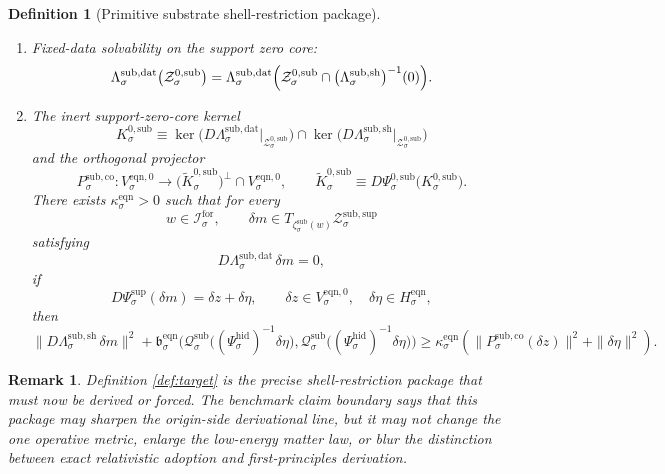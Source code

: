 \documentclass[11pt]{article}
\newcommand{\ForSpace}[1]{\mathcal I_{#1}^{\mathrm{for}}}
\newcommand{\EqnPair}[1]{\mathfrak b_{#1}^{\mathrm{eqn}}}
\newcommand{\EqnZero}[1]{V_{#1}^{\mathrm{eqn},0}}
\newcommand{\EqnHidden}[1]{H_{#1}^{\mathrm{eqn}}}
\newcommand{\SubData}[1]{\Lambda_{#1}^{\mathrm{sub,dat}}}
\newcommand{\SubShellMap}[1]{\Lambda_{#1}^{\mathrm{sub,sh}}}
\newcommand{\SubSupportShell}[1]{\mathcal Z_{#1}^{\mathrm{sub,sup}}}
\newcommand{\SubZeroCore}[1]{\mathcal Z_{#1}^{0,\mathrm{sub}}}
\newcommand{\ShellChart}[1]{\Psi_{#1}^{\mathrm{sup}}}
\newcommand{\SubZeroChart}[1]{\Psi_{#1}^{0,\mathrm{sub}}}
\newcommand{\HiddenChart}[1]{\Psi_{#1}^{\mathrm{hid}}}
\newcommand{\SubCharge}[1]{\mathcal Q_{#1}^{\mathrm{sub}}}
\newcommand{\SubEmbed}[1]{\zeta_{#1}^{\mathrm{sub}}}
\newcommand{\SubKernel}[1]{K_{#1}^{0,\mathrm{sub}}}
\newcommand{\SubKernelCh}[1]{\widetilde K_{#1}^{0,\mathrm{sub}}}
\newcommand{\SubStateComp}[1]{P_{#1}^{\mathrm{sub,co}}}
\newtheorem{definition}{Definition}
\newtheorem{remark}{Remark}
\begin{document}
\begin{definition}[Primitive substrate shell-restriction package]
\begin{enumerate}
    for every \(w\in\ForSpace{\sigma}\).
    \item Fixed-data solvability on the support zero core:
    \begin{equation}
    \SubData{\sigma}\bigl(\SubZeroCore{\sigma}\bigr)
    =
    \SubData{\sigma}\Bigl(
    \SubZeroCore{\sigma}\cap
    \bigl(\SubShellMap{\sigma}\bigr)^{-1}(0)
    \Bigr).
    \label{eq:subsolvability}
    \end{equation}
    \item The inert support-zero-core kernel
    \[
    \SubKernel{\sigma}
    \equiv
    \ker\bigl(D\SubData{\sigma}\big|_{\SubZeroCore{\sigma}}\bigr)
    \cap
    \ker\bigl(D\SubShellMap{\sigma}\big|_{\SubZeroCore{\sigma}}\bigr)
    \]
    and the orthogonal projector
    \[
    \SubStateComp{\sigma}:
    \EqnZero{\sigma}\to
    \bigl(\SubKernelCh{\sigma}\bigr)^{\perp}\cap\EqnZero{\sigma},
    \qquad
    \SubKernelCh{\sigma}
    \equiv
    D\SubZeroChart{\sigma}\bigl(\SubKernel{\sigma}\bigr).
    \]
    There exists \(\kappa_{\sigma}^{\mathrm{eqn}}>0\) such that for every
    \[
    w\in\ForSpace{\sigma},
    \qquad
    \delta m\in T_{\SubEmbed{\sigma}(w)}\SubSupportShell{\sigma}
    \]
    satisfying
    \[
    D\SubData{\sigma}\,\delta m=0,
    \]
    if
    \[
    D\ShellChart{\sigma}(\delta m)=\delta z+\delta\eta,
    \qquad
    \delta z\in\EqnZero{\sigma},
    \quad
    \delta\eta\in\EqnHidden{\sigma},
    \]
    then
    \begin{equation}
    \|D\SubShellMap{\sigma}\,\delta m\|^{2}
    +
    \EqnPair{\sigma}\bigl(
    \SubCharge{\sigma}\bigl((\HiddenChart{\sigma})^{-1}\delta\eta\bigr),
    \SubCharge{\sigma}\bigl((\HiddenChart{\sigma})^{-1}\delta\eta\bigr)
    \bigr)
    \ge
    \kappa_{\sigma}^{\mathrm{eqn}}
    \left(
    \|\SubStateComp{\sigma}(\delta z)\|^{2}
    +
    \|\delta\eta\|^{2}
    \right).
    \label{eq:subcoercive}
    \end{equation}
\end{enumerate}
\end{definition}

\begin{remark}
Definition \ref{def:target} is the precise shell-restriction package that must now be derived or forced. The benchmark claim boundary says that this package may sharpen the origin-side derivational line, but it may not change the one operative metric, enlarge the low-energy matter law, or blur the distinction between exact relativistic adoption and first-principles derivation.
\end{remark}
\end{document}
